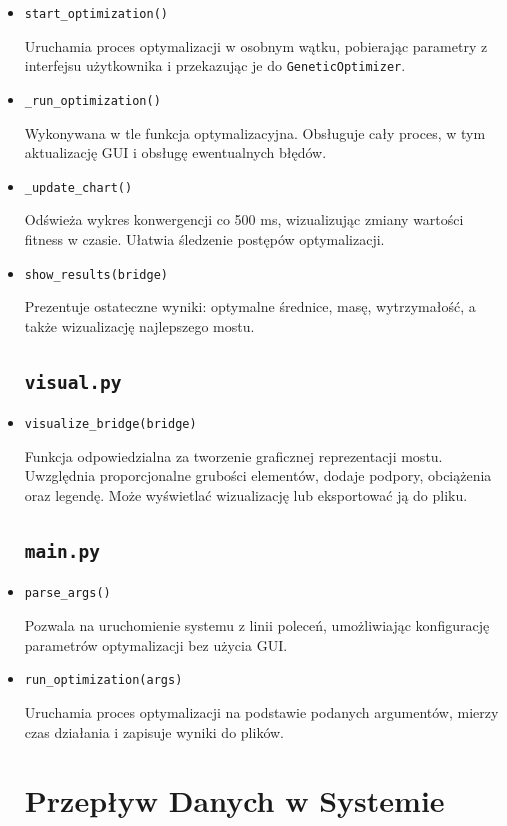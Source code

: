 \documentclass[12pt,a4paper]{article}
\begin{document}
\begin{itemize}
\item {\texttt{start\_optimization()}}

Uruchamia proces optymalizacji w osobnym wątku, pobierając parametry z interfejsu użytkownika i przekazując je do \texttt{GeneticOptimizer}.

\item {\texttt{\_run\_optimization()}}

Wykonywana w tle funkcja optymalizacyjna. Obsługuje cały proces, w tym aktualizację GUI i obsługę ewentualnych błędów.

\item {\texttt{\_update\_chart()}}

Odświeża wykres konwergencji co 500 ms, wizualizując zmiany wartości fitness w czasie. Ułatwia śledzenie postępów optymalizacji.

\item{\texttt{show\_results(bridge)}}

Prezentuje ostateczne wyniki: optymalne średnice, masę, wytrzymałość, a także wizualizację najlepszego mostu.

\subsection{\texttt{visual.py}}

\item {\texttt{visualize\_bridge(bridge)}}

Funkcja odpowiedzialna za tworzenie graficznej reprezentacji mostu. Uwzględnia proporcjonalne grubości elementów, dodaje podpory, obciążenia oraz legendę. Może wyświetlać wizualizację lub eksportować ją do pliku.

\subsection{\texttt{main.py}}

\item {\texttt{parse\_args()}}

Pozwala na uruchomienie systemu z linii poleceń, umożliwiając konfigurację parametrów optymalizacji bez użycia GUI.

\item {\texttt{run\_optimization(args)}}

Uruchamia proces optymalizacji na podstawie podanych argumentów, mierzy czas działania i zapisuje wyniki do plików.

\section{Przepływ Danych w Systemie}


\end{itemize}
\end{document}
